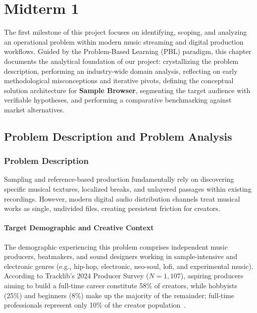 \chapter{Midterm 1}

The first milestone of this project focuses on identifying, scoping, and analyzing an operational problem within modern music streaming and digital production workflows. Guided by the Problem-Based Learning (PBL) paradigm, this chapter documents the analytical foundation of our project: crystallizing the problem description, performing an industry-wide domain analysis, reflecting on early methodological misconceptions and iterative pivots, defining the conceptual solution architecture for \textbf{Sample Browser}, segmenting the target audience with verifiable hypotheses, and performing a comparative benchmarking against market alternatives.

\section{Problem Description and Problem Analysis}

\subsection*{Problem Description}

Sampling and reference-based production fundamentally rely on discovering specific musical textures, localized breaks, and unlayered passages within existing recordings. However, modern digital audio distribution channels treat musical works as single, undivided files, creating persistent friction for creators.

\subsubsection*{Target Demographic and Creative Context}
The demographic experiencing this problem comprises independent music producers, beatmakers, and sound designers working in sample-intensive and electronic genres (e.g., hip-hop, electronic, neo-soul, lofi, and experimental music). According to Tracklib's 2024 Producer Survey ($N = 1,107$), aspiring producers aiming to build a full-time career constitute 58\% of creators, while hobbyists (25\%) and beginners (8\%) make up the majority of the remainder; full-time professionals represent only 10\% of the creator population~\cite{ref:tracklib2024}. 

